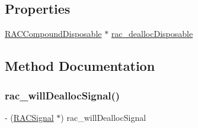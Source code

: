 \subsection*{Properties}
\begin{DoxyCompactItemize}
\item 
\mbox{\hyperlink{interface_r_a_c_compound_disposable}{R\+A\+C\+Compound\+Disposable}} $\ast$ \mbox{\hyperlink{category_n_s_object_07_r_a_c_deallocating_08_a6efe072a0bebe068cf03293fcec2f920}{rac\+\_\+dealloc\+Disposable}}
\end{DoxyCompactItemize}


\subsection{Method Documentation}
\mbox{\label{category_n_s_object_07_r_a_c_deallocating_08_a5a203df4b4af42221797e447090819c7}} 
\subsubsection{\texorpdfstring{rac\+\_\+will\+Dealloc\+Signal()}{rac\_willDeallocSignal()}\hspace{0.1cm}{\footnotesize\ttfamily [1/3]}}
{\footnotesize\ttfamily -\/ (\mbox{\hyperlink{interface_r_a_c_signal}{R\+A\+C\+Signal}} $\ast$) rac\+\_\+will\+Dealloc\+Signal \begin{DoxyParamCaption}{ }\end{DoxyParamCaption}}

